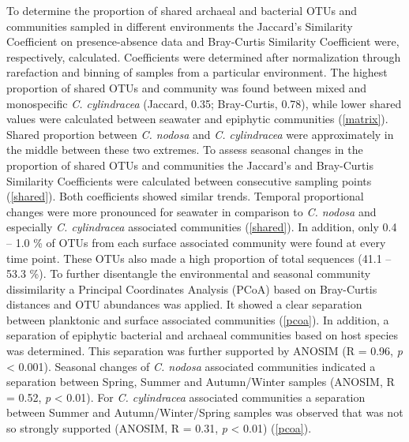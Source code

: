 \documentclass[12pt,]{article}
\begin{document}
To determine the proportion of shared archaeal and bacterial OTUs and
communities sampled in different environments the Jaccard's Similarity
Coefficient on presence-absence data and Bray-Curtis Similarity
Coefficient were, respectively, calculated. Coefficients were determined
after normalization through rarefaction and binning of samples from a
particular environment. The highest proportion of shared OTUs and
community was found between mixed and monospecific \emph{C. cylindracea}
(Jaccard, 0.35; Bray-Curtis, 0.78), while lower shared values were
calculated between seawater and epiphytic communities
(\autoref{matrix}). Shared proportion between \emph{C. nodosa} and
\emph{C. cylindracea} were approximately in the middle between these two
extremes. To assess seasonal changes in the proportion of shared OTUs
and communities the Jaccard's and Bray-Curtis Similarity Coefficients
were calculated between consecutive sampling points (\autoref{shared}).
Both coefficients showed similar trends. Temporal proportional changes
were more pronounced for seawater in comparison to \emph{C. nodosa} and
especially \emph{C. cylindracea} associated communities
(\autoref{shared}). In addition, only 0.4 -- 1.0 \si{\percent} of OTUs
from each surface associated community were found at every time point.
These OTUs also made a high proportion of total sequences (41.1 -- 53.3
\si{\percent}). To further disentangle the environmental and seasonal
community dissimilarity a Principal Coordinates Analysis (PCoA) based on
Bray-Curtis distances and OTU abundances was applied. It showed a clear
separation between planktonic and surface associated communities
(\autoref{pcoa}). In addition, a separation of epiphytic bacterial and
archaeal communities based on host species was determined. This
separation was further supported by ANOSIM (R = 0.96, \emph{p}
\textless{} 0.001). Seasonal changes of \emph{C. nodosa} associated
communities indicated a separation between Spring, Summer and
Autumn/Winter samples (ANOSIM, R = 0.52, \emph{p} \textless{} 0.01). For
\emph{C. cylindracea} associated communities a separation between Summer
and Autumn/Winter/Spring samples was observed that was not so strongly
supported (ANOSIM, R = 0.31, \emph{p} \textless{} 0.01)
(\autoref{pcoa}).
\end{document}
